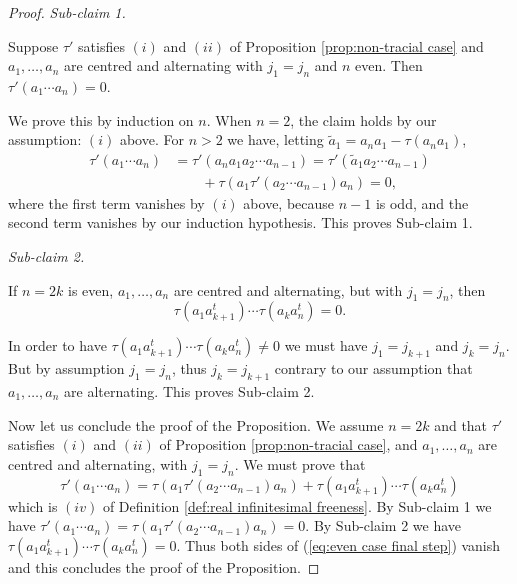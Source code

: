 \documentclass[11pt]{amsart}
\theoremstyle{definition}
\numberwithin{theorem}{section}
\begin{document}
\begin{proof}
\medskip\noindent\textit{Sub-claim 1.}\medskip

Suppose $\tau'$ satisfies $(i)$ and $(ii)$ of Proposition
\ref{prop:non-tracial case} and $a_1, \dots, a_n$ are
centred and alternating with $j_1 = j_n$ and $n$ even. Then
$\tau'(a_1 \cdots a_n) = 0$.


\medskip\noindent We prove this by induction on $n$. When $n
= 2$, the claim holds by our assumption: $(i)$ above. For $n
> 2$ we have, letting $\tilde{a}_1 = a_n a_1 - \tau(a_n
a_1)$,
\begin{align*}
\tau'(a_1 \cdots a_n) &= \tau'(a_na_1 a_2 \cdots a_{n-1})
=
\tau'(\tilde{a}_1 a_2 \cdots a_{n-1}) \\
& \qquad\mbox{} + \tau(a_1 \tau'(a_2 \cdots a_{n-1})a_n)
 = 0,
\end{align*}
where the first term vanishes by $(i)$ above, because $n-1$
is odd, and the second term vanishes by our induction
hypothesis. This proves Sub-claim 1.

\medskip\noindent\textit{Sub-claim 2.}\medskip

If $n = 2 k$ is even, $a_1, \dots, a_n$ are centred and alternating, but with $j_1 = j_n$, then 
\[
\tau(a_1 a_{k+1}^t) \cdots \tau(a_k a_n^t) = 0. 
\]


\medskip\noindent In order to have $\tau(a_1 a_{k+1}^t)
\cdots \tau(a_k a_n^t) \not = 0$ we must have $j_1 =
j_{k+1}$ and $j_k = j_n$. But by assumption $j_1 = j_n$,
thus $j_k = j_{k+1}$ contrary to our assumption that $a_1,
\dots, a_n$ are alternating. This proves Sub-claim
2. \medskip

Now let us conclude the proof of the Proposition. We assume
$n = 2 k$ and that $\tau'$ satisfies $(i)$ and $(ii)$ of
Proposition \ref{prop:non-tracial case}, and $a_1, \dots,
a_n$ are centred and alternating, with $j_1 = j_n$. We must
prove that
\begin{equation}\label{eq:even case final step}
\tau'(a_1 \cdots a_n)
=
\tau(a_1\tau'(a_2 \cdots a_{n-1}) a_n)
+
\tau(a_1 a_{k+1}^t) \cdots \tau(a_k a_n^t)
\end{equation}
which is $(iv)$ of Definition \ref{def:real infinitesimal
  freeness}. By Sub-claim 1 we have $\tau'(a_1 \cdots a_n) =
\tau(a_1\tau'(a_2 \cdots a_{n-1}) a_n) = 0$. By Sub-claim 2
we have $\tau(a_1 a_{k+1}^t) \cdots \tau(a_k a_n^t) =
0$. Thus both sides of (\ref{eq:even case final step})
vanish and this concludes the proof of the Proposition.
\end{proof}


\end{document}
